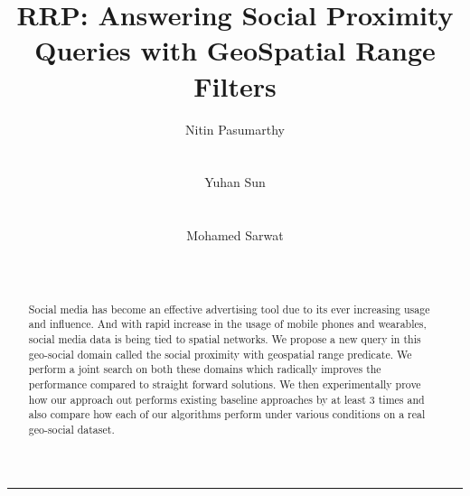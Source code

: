 \documentclass{sig-alternate-05-2015}
\newcommand{\rrp}{RRP}
\begin{document}
\title{{\rrp}: Answering Social Proximity Queries with GeoSpatial Range Filters}

\author{
\alignauthor
Nitin Pasumarthy\\
       \\
       \\
\alignauthor
Yuhan Sun\\
       \\
       \\
\alignauthor
Mohamed Sarwat\\
       \\
       \\
}

\maketitle
\begin{abstract}
Social media has become an effective advertising tool due to its ever increasing usage and influence. And with rapid increase in the usage of mobile phones and wearables, social media data is being tied to spatial networks. We propose a new query in this geo-social domain called the social proximity with geospatial range predicate. We perform a joint search on both these domains which radically improves the performance compared to straight forward solutions. We then experimentally prove how our approach out performs existing baseline approaches by at least 3 times and also compare how each of our algorithms perform under various conditions on a real geo-social dataset.
\end{abstract}

\printccsdesc



















\begin{center}\rule{0.5\linewidth}{\linethickness}\end{center}
\end{document}

